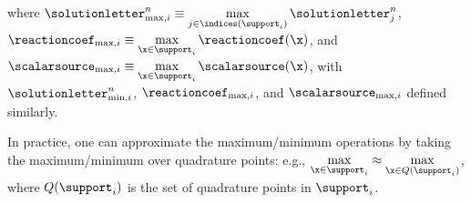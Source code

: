 where $\solutionletter_{\text{max},i}^n
  \equiv\max\limits_{j\in\indices(\support_i)}\solutionletter_j^n$,
$\reactioncoef_{\text{max},i}
  \equiv\max\limits_{\x\in\support_i}\reactioncoef(\x)$, and
$\scalarsource_{\text{max},i}
  \equiv\max\limits_{\x\in\support_i}\scalarsource(\x)$,
with $\solutionletter_{\text{min},i}^n$, $\reactioncoef_{\text{max},i}$,
and $\scalarsource_{\text{max},i}$ defined similarly.
\begin{remark}
In practice, one can approximate the maximum/minimum operations
by taking the maximum/minimum over quadrature points: e.g.,
$\max\limits_{\x\in\support_i} \approx \max\limits_{\x\in Q(\support_i)}$,
where $Q(\support_i)$ is the set of quadrature points in $\support_i$.
\end{remark}

